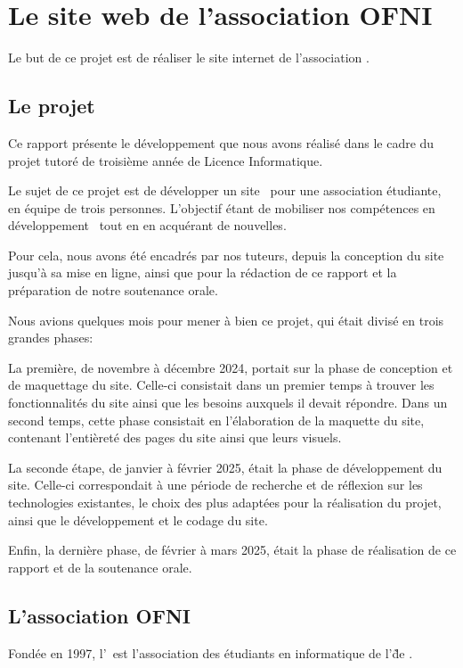 \chapter{Le site web de l'association OFNI}
\label{chap:site}

Le but de ce projet est de réaliser le site internet de l'association \ofni.

\section{Le projet}

Ce rapport présente le développement que nous avons réalisé dans le cadre du projet tutoré de troisième année de Licence Informatique.
\bigskip

Le sujet de ce projet est de développer un site \web\ pour une association étudiante, en équipe de trois personnes. L'objectif étant de mobiliser nos compétences en développement \web\ tout en en acquérant de nouvelles.

Pour cela, nous avons été encadrés par nos tuteurs, depuis la conception du site jusqu'à sa mise en ligne, ainsi que pour la rédaction de ce rapport et la préparation de notre soutenance orale.
\bigskip

Nous avions quelques mois pour mener à bien ce projet, qui était divisé en trois grandes phases:

La première, de novembre à décembre 2024, portait sur la phase de conception et de maquettage du site. 
Celle-ci consistait dans un premier temps à trouver les fonctionnalités du site ainsi que les besoins auxquels il devait répondre. 
Dans un second temps, cette phase consistait en l'élaboration de la maquette du site, contenant l'entièreté des pages du site ainsi que leurs visuels.

La seconde étape, de janvier à février 2025, était la phase de développement du site. 
Celle-ci correspondait à une période de recherche et de réflexion sur les technologies existantes, le choix des plus adaptées pour la réalisation du projet, ainsi que le développement et le codage du site.

Enfin, la dernière phase, de février à mars 2025, était la phase de réalisation de ce rapport et de la soutenance orale.

\section{L'association OFNI}

Fondée en 1997, l'\ofni\ est l'association des étudiants en informatique de l'\univ\~ de .
\bigskip

